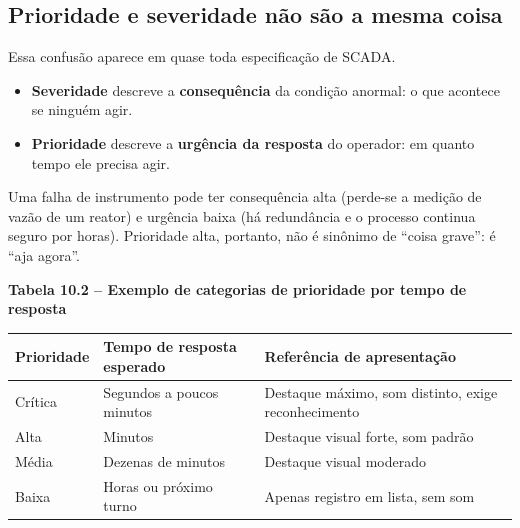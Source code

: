 \subsection{Prioridade e severidade não são a mesma coisa}\label{prioridade-e-severidade-nuxe3o-suxe3o-a-mesma-coisa}

Essa confusão aparece em quase toda especificação de SCADA.

\begin{itemize}
\tightlist
\item
  \textbf{Severidade} descreve a \textbf{consequência} da condição anormal: o que acontece se ninguém agir.
\item
  \textbf{Prioridade} descreve a \textbf{urgência da resposta} do operador: em quanto tempo ele precisa agir.
\end{itemize}

Uma falha de instrumento pode ter consequência alta (perde-se a medição de vazão de um reator) e urgência baixa (há redundância e o processo continua seguro por horas). Prioridade alta, portanto, não é sinônimo de ``coisa grave'': é ``aja agora''.

\textbf{Tabela 10.2 -- Exemplo de categorias de prioridade por tempo de resposta}

\begin{longtable}[]{@{}
  >{\raggedright\arraybackslash}p{}
  >{\raggedright\arraybackslash}p{}
  >{\raggedright\arraybackslash}p{}@{}}
\toprule\noalign{}
\begin{minipage}[b]{\linewidth}\raggedright
Prioridade
\end{minipage} & \begin{minipage}[b]{\linewidth}\raggedright
Tempo de resposta esperado
\end{minipage} & \begin{minipage}[b]{\linewidth}\raggedright
Referência de apresentação
\end{minipage} \\
\midrule\noalign{}
\endhead
\bottomrule\noalign{}
\endlastfoot
Crítica & Segundos a poucos minutos & Destaque máximo, som distinto, exige reconhecimento \\
Alta & Minutos & Destaque visual forte, som padrão \\
Média & Dezenas de minutos & Destaque visual moderado \\
Baixa & Horas ou próximo turno & Apenas registro em lista, sem som \\
\end{longtable}

